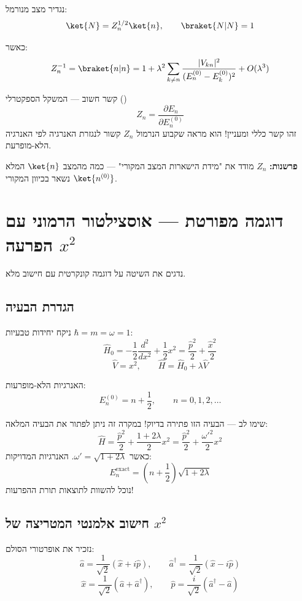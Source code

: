 נגדיר מצב מנורמל:
\[
\ket{N} = Z_n^{1/2}\ket{n}, \qquad \braket{N|N} = 1
\]

כאשר:
\[
Z_n^{-1} = \braket{n|n} = 1 + \lambda^2\sum_{k\neq n}\frac{|V_{kn}|^2}{(E_n^{(0)}-E_k^{(0)})^2} + O(\lambda^3)
\]

\begin{theorembox}{קשר חשוב — המשקל הספקטרלי ()}
\[
\boxed{Z_n = \frac{\partial E_n}{\partial E_n^{(0)}}}
\]
זהו קשר כללי ומעניין! הוא מראה שקבוע הנרמול $Z_n$ קשור לנגזרת האנרגיה לפי האנרגיה הלא-מופרעת.

\textbf{פרשנות:} $Z_n$ מודד את "מידת הישארות המצב המקורי" — כמה מהמצב $\ket{n}$ המלא נשאר בכיוון המקורי $\ket{n^{(0)}}$.
\end{theorembox}


\section{דוגמה מפורטת — אוסצילטור הרמוני עם הפרעה $x^2$}

נדגים את השיטה על דוגמה קונקרטית עם חישוב מלא.

\subsection{הגדרת הבעיה}
ניקח יחידות טבעיות $\hbar = m = \omega = 1$:
\[
\hat{H}_0 = -\frac{1}{2}\frac{d^2}{dx^2} + \frac{1}{2}x^2 = \frac{\hat{p}^2}{2} + \frac{\hat{x}^2}{2}
\]
\[
\hat{V} = x^2, \qquad \hat{H} = \hat{H}_0 + \lambda\hat{V}
\]

האנרגיות הלא-מופרעות:
\[
E_n^{(0)} = n + \frac{1}{2}, \qquad n = 0, 1, 2, \ldots
\]

\begin{notebox}{שימו לב — הבעיה הזו פתירה בדיוק!}
במקרה זה ניתן לפתור את הבעיה המלאה:
\[
\hat{H} = \frac{\hat{p}^2}{2} + \frac{1+2\lambda}{2}x^2 = \frac{\hat{p}^2}{2} + \frac{\omega'^2}{2}x^2
\]
כאשר $\omega' = \sqrt{1+2\lambda}$. האנרגיות המדויקות:
\[
E_n^{\text{exact}} = \left(n+\frac{1}{2}\right)\sqrt{1+2\lambda}
\]
נוכל להשוות לתוצאות תורת ההפרעות!
\end{notebox}

\subsection{חישוב אלמנטי המטריצה של $x^2$}

נזכיר את אופרטורי הסולם:
\[
\hat{a} = \frac{1}{\sqrt{2}}(\hat{x} + i\hat{p}), \qquad \hat{a}^\dagger = \frac{1}{\sqrt{2}}(\hat{x} - i\hat{p})
\]
\[
\hat{x} = \frac{1}{\sqrt{2}}(\hat{a} + \hat{a}^\dagger), \qquad \hat{p} = \frac{i}{\sqrt{2}}(\hat{a}^\dagger - \hat{a})
\]

